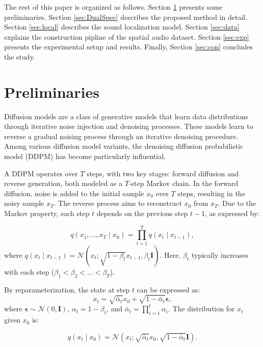 \documentclass{IEEEtran}
\begin{document}
The rest of this paper is organized as follows. Section \ref{sec:re} presents some preliminaries. Section \ref{sec:DualSpec} describes the proposed method in detail. Section \ref{sec:local} describes the sound localization model. Section \ref{sec:data} explains the construction pipline of the spatial audio dataset. Section \ref{sec:exp} presents the experimental setup and results. Finally, Section \ref{sec:con} concludes the study.


\section{Preliminaries}   \label{sec:re}




Diffusion models are a class of generative models that learn data distributions through iterative noise injection and denoising processes. These models learn to reverse a gradual noising process through an iterative denoising procedure. Among various diffusion model variants, the denoising diffusion probabilistic model (DDPM) \cite{ho2020denoising, Song2021} has become particularly influential.

A DDPM operates over $T$ steps, with two key stages: forward diffusion and reverse generation, both modeled as a $T$-step Markov chain. In the forward diffusion, noise is added to the initial sample $x_0$ over $T$ steps, resulting in the noisy sample $x_T$. The reverse process aims to reconstruct $x_0$ from $x_T$. Due to the Markov property, each step $t$ depends on the previous step $t-1$, as expressed by:

\begin{equation}
q(x_1, \dots, x_T \mid x_0) = \prod_{t=1}^{T} q(x_t \mid x_{t-1}),
\end{equation}
where
$
q(x_t \mid x_{t-1}) = \mathcal{N}(x_t; \sqrt{1-\beta_t} x_{t-1}, \beta_t \mathbf{I}).
$
Here, $\beta_t$ typically increases with each step ($\beta_1 < \beta_2 < \dots < \beta_T$).

By reparameterization, the state at step $t$ can be expressed as:
\begin{equation}
x_t = \sqrt{\bar{\alpha}_t} x_0 + \sqrt{1-\bar{\alpha}_t} \bm{\epsilon},
\end{equation}
where $\bm{\epsilon} \sim \mathcal{N}(0, \mathbf{I})$, $\alpha_t = 1 - \beta_t$, and $\bar{\alpha}_t = \prod_{i=1}^t \alpha_i$. The distribution for $x_t$ given $x_0$ is:

\begin{equation}
q(x_t \mid x_0) = \mathcal{N}(x_t; \sqrt{\bar{\alpha}_t} x_0, \sqrt{1-\bar{\alpha}_t} \mathbf{I}).
\end{equation}
\end{document}
